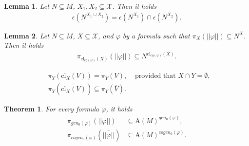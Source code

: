 \documentclass[10pt,a4paper]{amsart}
\newtheorem{lem}{Lemma}
\newtheorem{thm}{Theorem}
\def\A{\textrm{A}}
\def\X{\mathcal X}
\def\cl{\textrm{cl}}
\def\cogen{cogen}
\def\cogenz{\cogen_0}
\def\eq{eq}
\def\gen{gen}
\def\genz{\gen_0}
\begin{document}
\begin{lem}\label{lem:cap_dom}
Let $N\subseteq M$, $X_1,X_2\subseteq\X$. Then it holds
\begin{align*}
\epsilon(N^{X_1\cup X_2})=\epsilon(N^{X_1})\cap\epsilon(N^{X_2}). 
\end{align*}
\end{lem}

\begin{lem}\label{lem:eq_dom}
Let $N\subseteq M$, $X\subseteq\X$, and $\varphi$ by a formula such that $\pi_X(||\varphi||)\subseteq N^X$. Then it holds
\begin{align*}
\pi_{\cl_{\eq(\varphi)}(X)}(||\varphi||)\subseteq N^{\cl_{\eq(\varphi)}(X)}. 
\end{align*}
\end{lem}

\begin{align}
&\pi_Y(\cl_X(V))=\pi_Y(V),&\textrm{ provided that } X\cap Y=\emptyset, \label{eq:pi_C_disjoint}\\
&\pi_Y(\overline{\cl_X(V)})\subseteq\pi_Y(\overline{V}).& \label{eq:pi_overline_C}
\end{align}

\begin{thm}
For every formula $\varphi$, it holds
\begin{align*}
\pi_{\genz(\varphi)}(||\varphi||)&\subseteq \A(M)^{\genz(\varphi)},\\
\pi_{\cogenz(\varphi)}(\overline{||\varphi||})&\subseteq \A(M)^{\cogenz(\varphi)}. 
\end{align*}
\end{thm}
\end{document}

